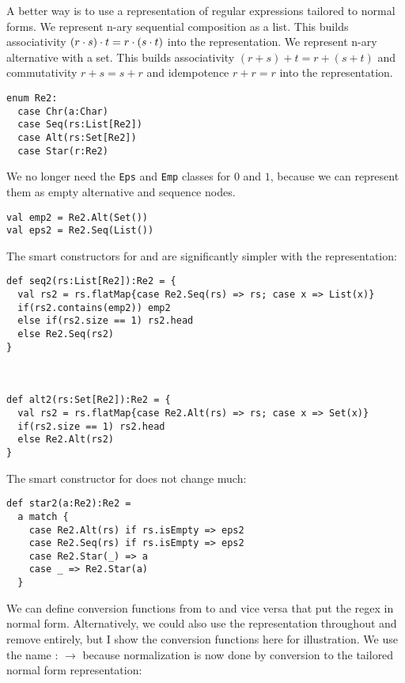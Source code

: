 A better way is to use a representation of regular expressions tailored to normal forms. We represent n-ary sequential composition as a list. This builds associativity $(r \cdot s) \cdot t = r \cdot (s \cdot t)$ into the representation. We represent n-ary alternative with a set. This builds associativity $(r + s) + t = r + (s + t)$ and commutativity $r + s = s + r$ and idempotence $r + r = r$ into the representation.

\begin{lstlisting}
enum Re2:
  case Chr(a:Char)
  case Seq(rs:List[Re2])
  case Alt(rs:Set[Re2])
  case Star(r:Re2)
\end{lstlisting}

We no longer need the \lstinline|Eps| and \lstinline|Emp| classes for $0$ and $1$, because we can represent them as empty alternative and sequence nodes.

\begin{lstlisting}
val emp2 = Re2.Alt(Set())
val eps2 = Re2.Seq(List())
\end{lstlisting}

The smart constructors for  and  are significantly simpler with the  representation:

\begin{lstlisting}
def seq2(rs:List[Re2]):Re2 = {
  val rs2 = rs.flatMap{case Re2.Seq(rs) => rs; case x => List(x)}
  if(rs2.contains(emp2)) emp2
  else if(rs2.size == 1) rs2.head
  else Re2.Seq(rs2)
}



def alt2(rs:Set[Re2]):Re2 = {
  val rs2 = rs.flatMap{case Re2.Alt(rs) => rs; case x => Set(x)}
  if(rs2.size == 1) rs2.head
  else Re2.Alt(rs2)
}
\end{lstlisting}

The smart constructor for  does not change much:

\begin{lstlisting}
def star2(a:Re2):Re2 =
  a match {
    case Re2.Alt(rs) if rs.isEmpty => eps2
    case Re2.Seq(rs) if rs.isEmpty => eps2
    case Re2.Star(_) => a
    case _ => Re2.Star(a)
  }
\end{lstlisting}

We can define conversion functions from  to  and vice versa that put the regex in normal form.
Alternatively, we could also use the  representation throughout and remove  entirely, but I show the conversion functions here for illustration.
We use the name  :  $\to$  because normalization is now done by conversion to the tailored normal form representation:

